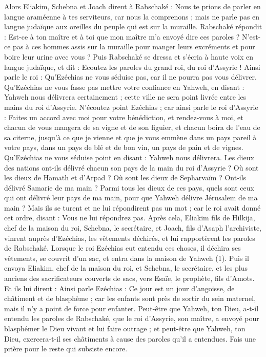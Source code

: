 \begin{multicols}{2}
{Alors Eliakim, Schebna et Joach dirent à Rabschaké : Nous te prions de parler en langue araméenne à tes serviteurs, car nous la comprenons ; mais ne parle pas en langue judaïque aux oreilles du peuple qui est sur la muraille.
Rabschaké répondit : Est-ce à ton maître et à toi que mon maître m’a envoyé dire ces paroles ? N’est-ce pas à ces hommes assis sur la muraille pour manger leurs excréments et pour boire leur urine avec vous ?
Puis Rabschaké se dressa et s'écria à haute voix en langue judaïque, et dit : Ecoutez les paroles du grand roi, du roi d’Assyrie !
Ainsi parle le roi : Qu'Ezéchias ne vous séduise pas, car il ne pourra pas vous délivrer.
Qu'Ezéchias ne vous fasse pas mettre votre confiance en Yahweh, en disant : Yahweh nous délivrera certainement ; cette ville ne sera point livrée entre les mains du roi d’Assyrie.
N'écoutez point Ezéchias ; car ainsi parle le roi d’Assyrie : Faites un accord avec moi pour votre bénédiction, et rendez-vous à moi, et chacun de vous mangera de sa vigne et de son figuier, et chacun boira de l'eau de sa citerne,
jusqu'à ce que je vienne et que je vous emmène dans un pays pareil à votre pays, dans un pays de blé et de bon vin, un pays de pain et de vignes.
Qu'Ezéchias ne vous séduise point en disant : Yahweh nous délivrera. Les dieux des nations ont-ils délivré chacun son pays de la main du roi d’Assyrie ?
Où sont les dieux de Hamath et d'Arpad ? Où sont les dieux de Sepharvaïm ? Ont-ils délivré Samarie de ma main ?
Parmi tous les dieux de ces pays, quels sont ceux qui ont délivré leur pays de ma main, pour que Yahweh délivre Jérusalem de ma main ?
Mais ils se turent et ne lui répondirent pas un mot ; car le roi avait donné cet ordre, disant : Vous ne lui répondrez pas.
Après cela, Eliakim fils de Hilkija, chef de la maison du roi, Schebna, le secrétaire, et Joach, fils d'Asaph l’archiviste, vinrent auprès d’Ezéchias, les vêtements déchirés, et lui rapportèrent les paroles de Rabschaké.
\VerseOne{}Lorsque le roi Ezéchias eut entendu ces choses, il déchira ses vêtements, se couvrit d'un sac, et entra dans la maison de Yahweh (1).
Puis il envoya Eliakim, chef de la maison du roi, et Schebna, le secrétaire, et les plus anciens des sacrificateurs couverts de sacs, vers Esaïe, le prophète, fils d'Amots.
Et ils lui dirent : Ainsi parle Ezéchias : Ce jour est un jour d'angoisse, de châtiment et de blasphème ; car les enfants sont près de sortir du sein maternel, mais il n'y a point de force pour enfanter.
Peut-être que Yahweh, ton Dieu, a-t-il entendu les paroles de Rabschaké, que le roi d’Assyrie, son maître, a envoyé pour blasphémer le Dieu vivant et lui faire outrage ; et peut-être que Yahweh, ton Dieu, exercera-t-il ses châtiments à cause des paroles qu’il a entendues. Fais une prière pour le reste qui subsiste encore.
}
\end{multicols}
